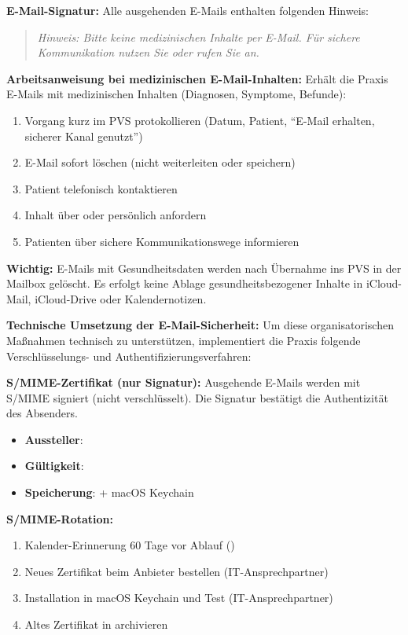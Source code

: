 \textbf{E-Mail-Signatur:} Alle ausgehenden E-Mails enthalten folgenden Hinweis:
\begin{quote}
\textit{Hinweis: Bitte keine medizinischen Inhalte per E-Mail.
Für sichere Kommunikation nutzen Sie \PatKomTool{} oder rufen Sie an.}
\end{quote}

\textbf{Arbeitsanweisung bei medizinischen E-Mail-Inhalten:} Erhält die Praxis
E-Mails mit medizinischen Inhalten (Diagnosen, Symptome, Befunde):
\begin{enumerate}
  \item Vorgang kurz im PVS protokollieren (Datum, Patient, \enquote{E-Mail erhalten, sicherer Kanal genutzt})
  \item E-Mail sofort löschen (nicht weiterleiten oder speichern)
  \item Patient telefonisch kontaktieren
  \item Inhalt über \PatKomTool{} oder persönlich anfordern
  \item Patienten über sichere Kommunikationswege informieren
\end{enumerate}

\textbf{Wichtig:} E-Mails mit Gesundheitsdaten werden nach Übernahme ins PVS in der
Mailbox gelöscht. Es erfolgt keine Ablage gesundheitsbezogener Inhalte in
iCloud-Mail, iCloud-Drive oder Kalendernotizen.

\textbf{Technische Umsetzung der E-Mail-Sicherheit:} Um diese organisatorischen
Maßnahmen technisch zu unterstützen, implementiert die Praxis folgende
Verschlüsselungs- und Authentifizierungsverfahren:

\textbf{S/MIME-Zertifikat (nur Signatur):} Ausgehende E-Mails werden mit S/MIME
signiert (nicht verschlüsselt). Die Signatur bestätigt die Authentizität des Absenders.
\begin{itemize}
  \item \textbf{Aussteller}: \SMIMEIssuer{}
  \item \textbf{Gültigkeit}: \SMIMEValidity{}
  \item \textbf{Speicherung}: \PasswortManager{} + macOS Keychain
\end{itemize}

\textbf{S/MIME-Rotation:}
\begin{enumerate}
  \item Kalender-Erinnerung 60 Tage vor Ablauf (\PraxisInhaberBezeichnung{})
  \item Neues Zertifikat beim Anbieter bestellen (IT-Ansprechpartner)
  \item Installation in macOS Keychain und Test (IT-Ansprechpartner)
  \item Altes Zertifikat in \PasswortManager{} archivieren
\end{enumerate}

